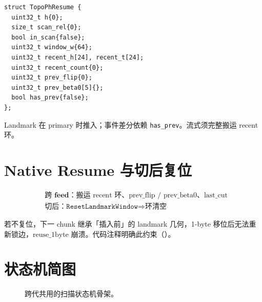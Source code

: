\begin{lstlisting}[caption={TopoPhResume},label={lst:ph-resume}]
struct TopoPhResume {
  uint32_t h{0};
  size_t scan_rel{0};
  bool in_scan{false};
  uint32_t window_w{64};
  uint32_t recent_h[24], recent_t[24];
  uint32_t recent_count{0};
  uint32_t prev_flip{0};
  uint32_t prev_beta0[5]{};
  bool has_prev{false};
};
\end{lstlisting}

Landmark 在 primary 时推入；事件差分依赖 \texttt{has\_prev}。流式须完整搬运 recent 环。

\section{Native Resume 与切后复位}

\begin{align}
&\textbf{跨 feed：} \text{搬运 recent 环、prev\_flip / prev\_beta0、last\_cut}\\
&\textbf{切后：} \texttt{ResetLandmarkWindow}\Rightarrow\text{环清空}
\end{align}

\begin{designbox}[为何切后必须复位]
若不复位，下一 chunk 继承「插入前」的 landmark 几何，1-byte 移位后无法重新锁边，$\mathrm{reuse\_1byte}$ 崩溃。代码注释明确此约束（）。
\end{designbox}

\section{状态机简图}

\begin{figure}[htbp]
\centering
{}
\caption{跨代共用的扫描状态机骨架。}
\label{fig:stream-sm}
\end{figure}
